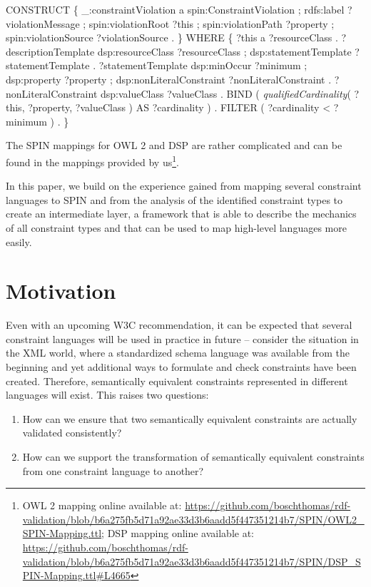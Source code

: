 \documentclass[a4paper,fontsize=11pt]{scrartcl}
\begin{document}
\begin{ex}[commandchars=\\\{\}]
CONSTRUCT \{
    _:constraintViolation 
        a spin:ConstraintViolation ;
        rdfs:label ?violationMessage ;
        spin:violationRoot ?this ;
        spin:violationPath ?property ;
        spin:violationSource ?violationSource . \}
WHERE \{	
    ?this a ?resourceClass .
    ?descriptionTemplate 
        dsp:resourceClass ?resourceClass ;
        dsp:statementTemplate ?statementTemplate .
    ?statementTemplate 
        dsp:minOccur ?minimum ;
        dsp:property ?property ;
        dsp:nonLiteralConstraint ?nonLiteralConstraint .
    ?nonLiteralConstraint dsp:valueClass ?valueClass .	
    BIND ( \textit{qualifiedCardinality}( ?this, ?property, ?valueClass ) AS ?cardinality ) .
    FILTER ( ?cardinality < ?minimum ) . \}
\end{ex}

The SPIN mappings for OWL 2 and DSP are rather complicated and can be found in the mappings provided by us\footnote{OWL 2 mapping online available at: \url{https://github.com/boschthomas/rdf-validation/blob/b6a275fb5d71a92ae33d3b6aadd5f447351214b7/SPIN/OWL2_SPIN-Mapping.ttl}; DSP mapping online available at: \url{https://github.com/boschthomas/rdf-validation/blob/b6a275fb5d71a92ae33d3b6aadd5f447351214b7/SPIN/DSP_SPIN-Mapping.ttl#L4665}}.

In this paper, we build on the experience gained from mapping several constraint languages to SPIN and from the analysis of the identified constraint types to create an intermediate layer, a framework that is able to describe the mechanics of all constraint types and that can be used to map high-level languages more easily. 

\section{Motivation}
\label{sec:motivation}
Even with an upcoming W3C recommendation, it can be expected that several constraint languages will be used in practice in future -- consider the situation in the XML world, where a standardized schema language was available from the beginning and yet additional ways to formulate and check constraints have been created. Therefore, 
semantically equivalent constraints represented in different languages will exist.
This raises two questions: 
\begin{enumerate}
 \item How can we ensure that two semantically equivalent constraints are actually validated consistently?
 \item How can we support the transformation of semantically equivalent constraints from one constraint language to another?
\end{enumerate}
\end{document}
